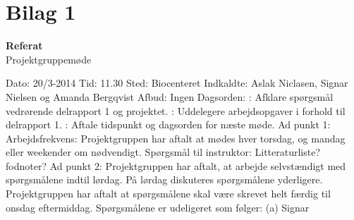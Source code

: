 \documentclass[a4paper,12pt]{article}
\begin{document}
\section{Bilag 1}
\begin{center}
\huge{\bf{Referat}}
\\
\normalsize{Projektgruppemøde}
\end{center}
Dato: 20/3-2014
\newline
\newline
Tid: 11.30
\newline
\newline
Sted: Biocenteret
\newline
\newline
Indkaldte: Aslak Niclasen, Signar Nielsen og Amanda Bergqvist
\newline
\newline
Afbud: Ingen
\newline
\newline
\newline
\newline
Dagsorden:
\newline
{}: Afklare spørgsmål vedrørende delrapport 1 og projektet.
\newline
{}: Uddelegere arbejdsopgaver i forhold til delrapport 1.
\newline
{}: Aftale tidspunkt og dagsorden for næste møde.
\newline
\newline
\newline
\newline
Ad punkt 1:
Arbejdsfrekvens: Projektgruppen har aftalt at mødes hver torsdag, og mandag eller weekender om nødvendigt. 
\newline
\newline
Spørgsmål til instruktor: Litteraturliste? fodnoter?
\newline
\newline
Ad punkt 2: Projektgruppen har aftalt, at arbejde selvstændigt med spørgsmålene indtil lørdag. På lørdag diskuteres spørgsmålene yderligere. Projektgruppen har aftalt at spørgsmålene skal være skrevet helt færdig til onsdag eftermiddag. 
Spørgsmålene er udeligeret som følger:   
\newline
\newline
(a) Signar 
\newline
\newline
\end{document}
